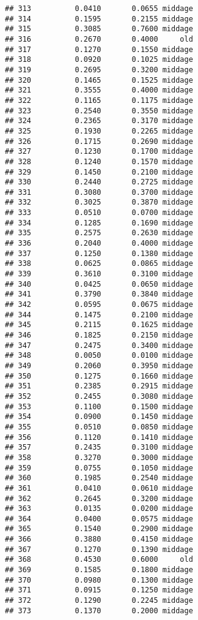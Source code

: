 \documentclass[
]{article}
\begin{document}
\begin{verbatim}
## 313          0.0410       0.0655 middage
## 314          0.1595       0.2155 middage
## 315          0.3085       0.7600 middage
## 316          0.2670       0.4000     old
## 317          0.1270       0.1550 middage
## 318          0.0920       0.1025 middage
## 319          0.2695       0.3200 middage
## 320          0.1465       0.1525 middage
## 321          0.3555       0.4000 middage
## 322          0.1165       0.1175 middage
## 323          0.2540       0.3550 middage
## 324          0.2365       0.3170 middage
## 325          0.1930       0.2265 middage
## 326          0.1715       0.2690 middage
## 327          0.1230       0.1700 middage
## 328          0.1240       0.1570 middage
## 329          0.1450       0.2100 middage
## 330          0.2440       0.2725 middage
## 331          0.3080       0.3700 middage
## 332          0.3025       0.3870 middage
## 333          0.0510       0.0700 middage
## 334          0.1285       0.1690 middage
## 335          0.2575       0.2630 middage
## 336          0.2040       0.4000 middage
## 337          0.1250       0.1380 middage
## 338          0.0625       0.0865 middage
## 339          0.3610       0.3100 middage
## 340          0.0425       0.0650 middage
## 341          0.3790       0.3840 middage
## 342          0.0595       0.0675 middage
## 344          0.1475       0.2100 middage
## 345          0.2115       0.1625 middage
## 346          0.1825       0.2150 middage
## 347          0.2475       0.3400 middage
## 348          0.0050       0.0100 middage
## 349          0.2060       0.3950 middage
## 350          0.1275       0.1660 middage
## 351          0.2385       0.2915 middage
## 352          0.2455       0.3080 middage
## 353          0.1100       0.1500 middage
## 354          0.0900       0.1450 middage
## 355          0.0510       0.0850 middage
## 356          0.1120       0.1410 middage
## 357          0.2435       0.3100 middage
## 358          0.3270       0.3000 middage
## 359          0.0755       0.1050 middage
## 360          0.1985       0.2540 middage
## 361          0.0410       0.0610 middage
## 362          0.2645       0.3200 middage
## 363          0.0135       0.0200 middage
## 364          0.0400       0.0575 middage
## 365          0.1540       0.2900 middage
## 366          0.3880       0.4150 middage
## 367          0.1270       0.1390 middage
## 368          0.4530       0.6000     old
## 369          0.1585       0.1800 middage
## 370          0.0980       0.1300 middage
## 371          0.0915       0.1250 middage
## 372          0.1290       0.2245 middage
## 373          0.1370       0.2000 middage

\end{verbatim}
\end{document}
